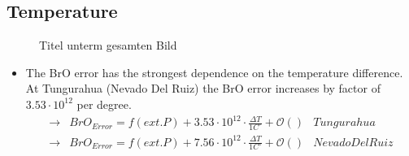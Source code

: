 \documentclass  [
  paper    = a4,
  BCOR     = 10mm,
  twoside,
  fontsize = 12pt,
  fleqn,
  toc      = bibnumbered,
  toc      = listofnumbered,
  numbers  = noendperiod,
  headings = normal,
  listof   = leveldown,
  version  = 3.03
]                                       {scrreprt}
\begin{document}
	\subsection{Temperature}
	\begin{figure}[h!]			
		\caption{Titel unterm gesamten Bild}
	\end{figure}
	\begin{itemize}
		\item The BrO error has the strongest dependence on the temperature difference. At Tungurahua (Nevado Del Ruiz) the BrO error increases by factor of $3.53\cdot10^{12}$  per degree.
		\begin{align*}
		\rightarrow&  BrO_{Error} = f(ext. P)+ 3.53\cdot10^{12}\cdot\frac{\Delta T}{1C^{\circ}} + \mathcal{O}\left(\right) & Tungurahua\\
		\rightarrow&  BrO_{Error} = f(ext. P)+7.56\cdot10^{12}\cdot\frac{\Delta T}{1C^{\circ}} + \mathcal{O}\left(\right) & Nevado Del Ruiz\\
		\end{align*}
	\end{itemize}
\end{document}
